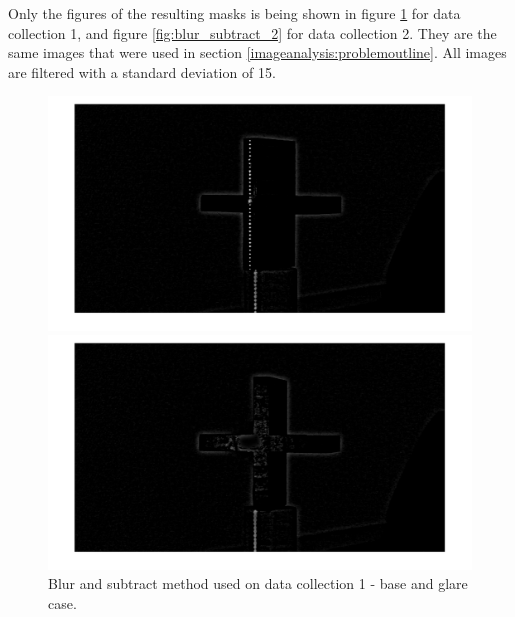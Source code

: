 Only the figures of the resulting masks is being shown in figure \ref{fig:blur_subtract_1} for data collection 1, and figure \ref{fig:blur_subtract_2} for data collection 2. They are the same images that were used in section \ref{imageanalysis:problemoutline}. All images are filtered with a standard deviation of 15. 
\FloatBarrier
\begin{figure}[ht!]
	
	\begin{minipage}[t]{0.48\textwidth}
		\hspace{-0.75cm}
		\includegraphics[width=1.2\textwidth]{figures/ImageAnalysis/blur_subtract/blur_base1.png}
	\end{minipage}
	\hspace{0.02\textwidth}
	\begin{minipage}[t]{0.48\textwidth}
		\hspace{-0.75cm}
		\includegraphics[width=1.2\textwidth]{figures/ImageAnalysis/blur_subtract/blur_glare1.png}
	\end{minipage}
	\caption{Blur and subtract method used on data collection 1 - base and glare case.}
	\label{fig:blur_subtract_1}
\end{figure}
